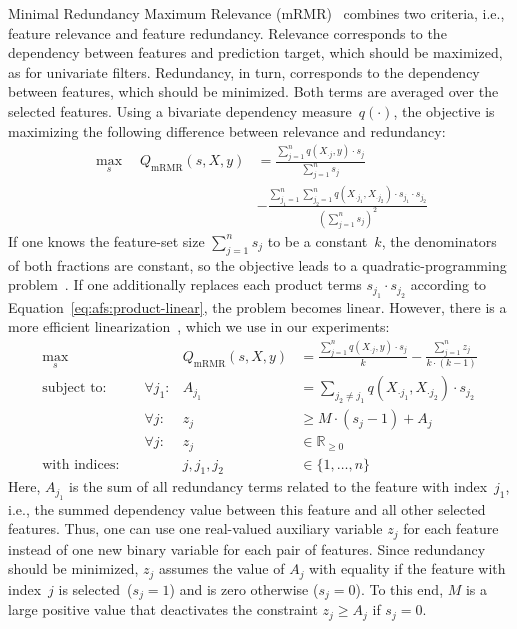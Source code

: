 \documentclass{article}
\theoremstyle{definition}
\begin{document}
Minimal Redundancy Maximum Relevance (mRMR)~\cite{peng2005feature} combines two criteria, i.e., feature relevance and feature redundancy.
Relevance corresponds to the dependency between features and prediction target, which should be maximized, as for univariate filters.
Redundancy, in turn, corresponds to the dependency between features, which should be minimized.
Both terms are averaged over the selected features.
Using a bivariate dependency measure~$q(\cdot)$, the objective is maximizing the following difference between relevance and redundancy:
%
\begin{equation}
	\begin{aligned}
		\max_s \quad Q_{\text{mRMR}}(s,X,y) &= \frac{\sum_{j=1}^{n} q(X_{\cdot{}j},y) \cdot s_j}{\sum_{j=1}^{n} s_j} \\
		&- \frac{\sum_{j_1=1}^{n} \sum_{j_2=1}^{n} q(X_{\cdot{}j_1}, X_{\cdot{}j_2}) \cdot s_{j_1} \cdot s_{j_2}}{(\sum_{j=1}^{n} s_j)^2}
	\end{aligned}
	\label{eq:afs:mrmr}
\end{equation}
%
If one knows the feature-set size $\sum_{j=1}^{n} s_j$ to be a constant~$k$, the denominators of both fractions are constant, so the objective leads to a quadratic-programming problem~\cite{nguyen2014effective, rodriguez2010quadratic}.
If one additionally replaces each product terms $s_{j_1} \cdot s_{j_2}$ according to Equation~\ref{eq:afs:product-linear}, the problem becomes linear.
However, there is a more efficient linearization~\cite{nguyen2009optimizing, nguyen2010towards}, which we use in our experiments:
%
\begin{equation}
	\begin{aligned}
		\max_s &\quad & Q_{\text{mRMR}}(s,X,y) &= \frac{\sum_{j=1}^{n} q(X_{\cdot{}j},y) \cdot s_j}{k} - \frac{\sum_{j=1}^{n} z_j}{k \cdot (k-1)} \\
		\text{subject to:} &\quad \forall j_1: & A_{j_1} &= \sum_{j_2 \neq j_1} q(X_{\cdot{}j_1}, X_{\cdot{}j_2}) \cdot s_{j_2} \\
		&\quad \forall j: & z_j &\geq M \cdot (s_j - 1) + A_j \\
		&\quad \forall j: & z_j &\in \mathbb{R}_{\geq 0} \\
		\text{with indices:} &\quad & j, j_1, j_2 &\in \{1, \dots, n\}
	\end{aligned}
	\label{eq:afs:mrmr-linear}
\end{equation}
%
Here, $A_{j_1}$ is the sum of all redundancy terms related to the feature with index~$j_1$, i.e., the summed dependency value between this feature and all other selected features.
Thus, one can use one real-valued auxiliary variable $z_j$ for each feature instead of one new binary variable for each pair of features.
Since redundancy should be minimized, $z_j$ assumes the value of $A_j$ with equality if the feature with index~$j$ is selected~($s_j=1$) and is zero otherwise ($s_j=0$).
To this end, $M$ is a large positive value that deactivates the constraint $z_j \geq A_j$ if $s_j=0$.
\end{document}
